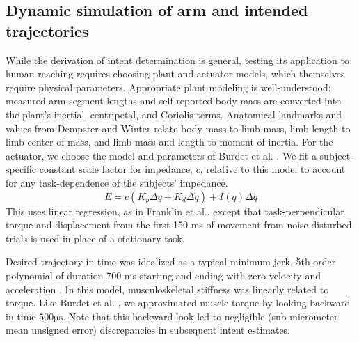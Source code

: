 \subsection*{Dynamic simulation of arm and intended trajectories}
While the derivation of intent determination is general, testing its application to human reaching requires choosing plant and actuator models, which themselves require physical parameters. Appropriate plant modeling is well-understood: measured arm segment lengths and self-reported body mass are converted into the plant's inertial, centripetal, and Coriolis terms. Anatomical landmarks and values from Dempster \cite{dempster1955space} and Winter \cite{winter2009biomechanics} relate body mass to limb mass, limb length to limb center of mass, and limb mass and length to moment of inertia. For the actuator, we choose the model and parameters of Burdet et al. \cite{burdet2006stability}. We fit a subject-specific constant scale factor for impedance, $c$, relative to this model to account for any task-dependence of the subjects' impedance\cite{gomi1998task}.
\begin{equation}
E=c(K_p\Delta q+K_d \Delta \dot{q})+I(q)\Delta\ddot{q}
\end{equation}
This uses linear regression, as in Franklin et al.\cite{franklin2003adaptation}, except that task-perpendicular torque and displacement from the first 150 ms of movement from noise-disturbed trials is used in place of a stationary task.  

Desired trajectory in time was idealized as a typical minimum jerk, 5th order polynomial of duration 700 ms starting and ending with zero velocity and acceleration \cite{flash1985coordination}.  In this  model, musculoskeletal stiffness was linearly related to torque. Like Burdet et al. \cite{burdet2006stability}, we approximated muscle torque by looking backward in time $500 \mathrm{\mu s}$. Note that this backward look led to negligible (sub-micrometer mean unsigned error) discrepancies in subsequent intent estimates. 

